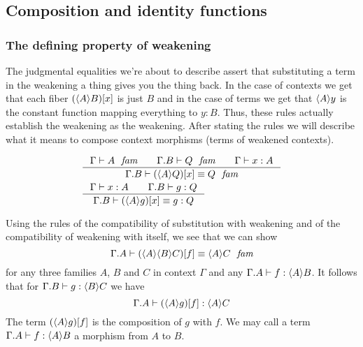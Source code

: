 \subsection{Composition and identity functions}
\subsubsection{The defining property of weakening}
The judgmental equalities we're about to describe assert that substituting a term
in the weakening a thing gives you the thing back. In the case of contexts we get that each fiber
$\subst{x}{\ctxwk{A}{B}}$ is just $B$ and in the case of terms we get 
that $\ctxwk{A}{y}$ is the constant function
mapping everything to $y:B$. Thus, these rules actually establish the weakening
as the weakening. After stating the rules we will describe what it means to
compose context morphisms (terms of weakened contexts).

\begin{align}
& \inference{\jfam{\Gamma}{A}\qquad\jfam{\ctxext{\Gamma}{B}}{Q}\qquad\jterm{\Gamma}{A}{x}}{\jfameq{\ctxext{\Gamma}{B}}{\subst{x}{\ctxwk{A}{Q}}}{Q}}\label{defn-ws-3}\\
& \inference{\jterm{\Gamma}{A}{x}\qquad\jterm{\ctxext{\Gamma}{B}}{Q}{g}}{\jtermeq{\ctxext{\Gamma}{B}}{Q}{\subst{x}{\ctxwk{A}{g}}}{g}}\label{defn-ws-4}
\end{align}

Using the rules of the compatibility of substitution with weakening and of the
compatibility of weakening with itself, we see that we can show
\begin{equation*}
\jfameq{\ctxext{\Gamma}{A}}{\subst{f}{\ctxwk{A}{{B}{C}}}}{\ctxwk{A}{C}}
\end{equation*}
for any three families $A$, $B$ and $C$ in context $\Gamma$ and any $\jterm{\ctxext{\Gamma}{A}}{\ctxwk{A}{B}}{f}$.
It follows that for $\jterm{\ctxext{\Gamma}{B}}{\ctxwk{B}{C}}{g}$ we have
\begin{equation*}
\jterm{\ctxext{\Gamma}{A}}{\ctxwk{A}{C}}{\subst{f}{\ctxwk{A}{g}}}
\end{equation*}
The term $\jcomp{A}{f}{g}$ is the composition of $g$ with $f$. We may call
a term $\jterm{\ctxext{\Gamma}{A}}{\ctxwk{A}{B}}{f}$ a morphism from $A$ to $B$.

